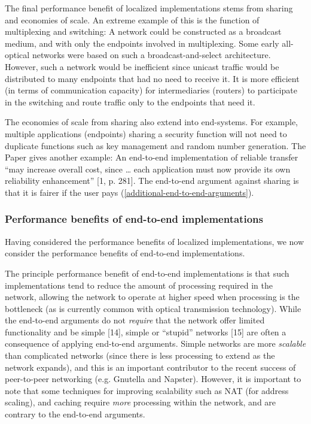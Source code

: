 \documentclass[a4paper,11pt,notitlepage,twoside,openright]{article}
\begin{document}
The final performance benefit of localized implementations stems from
sharing and economies of scale. An extreme example of this is the
function of multiplexing and switching: A network could be constructed
as a broadcast medium, and with only the endpoints involved in
multiplexing. Some early all-optical networks were based on such a
broadcast-and-select architecture. However, such a network would be
inefficient since unicast traffic would be distributed to many endpoints
that had no need to receive it. It is more efficient (in terms of
communication capacity) for intermediaries (routers) to participate in
the switching and route traffic only to the endpoints that need it.

The economies of scale from sharing also extend into end-systems. For
example, multiple applications (endpoints) sharing a security function
will not need to duplicate functions such as key management and random
number generation. The Paper gives another example: An end-to-end
implementation of reliable transfer ``may increase overall cost, since
\ldots{} each application must now provide its own reliability
enhancement'' {[}1, p. 281{]}. The end-to-end argument against sharing
is that it is fairer if the user pays (\autoref{additional-end-to-end-arguments}).

\hypertarget{performance-benefits-of-end-to-end-implementations}{%
\subsubsection{Performance benefits of end-to-end implementations
}\label{performance-benefits-of-end-to-end-implementations}}

Having considered the performance benefits of localized implementations,
we now consider the performance benefits of end-to-end implementations.

The principle performance benefit of end-to-end implementations is that
such implementations tend to reduce the amount of processing required in
the network, allowing the network to operate at higher speed when
processing is the bottleneck (as is currently common with optical
transmission technology). While the end-to-end arguments do not
\emph{require} that the network offer limited functionality and be
simple {[}14{]}, simple or ``stupid'' networks {[}15{]} are often a
consequence of applying end-to-end arguments. Simple networks are more
\emph{scalable} than complicated networks (since there is less
processing to extend as the network expands), and this is an important
contributor to the recent success of peer-to-peer networking (e.g.
Gnutella and Napster). However, it is important to note that some
techniques for improving scalability such as NAT (for address scaling),
and caching require \emph{more} processing within the network, and are
contrary to the end-to-end arguments.
\end{document}
